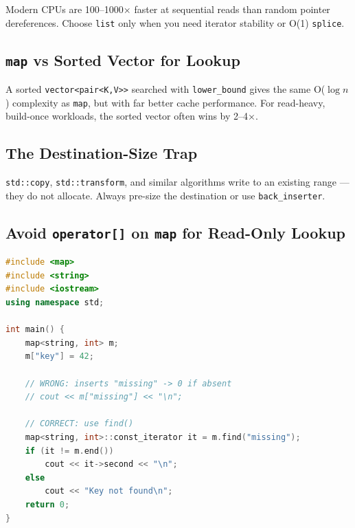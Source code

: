Modern CPUs are 100--1000× faster at sequential reads than random pointer dereferences. Choose \texttt{list} only when you need iterator stability or O(1) \texttt{splice}.

\subsection{\texttt{map} vs Sorted Vector for Lookup}

A sorted \texttt{vector<pair<K,V>>} searched with \texttt{lower\_bound} gives the same O(\(\log n\)) complexity as \texttt{map}, but with far better cache performance. For read-heavy, build-once workloads, the sorted vector often wins by 2--4×.

\subsection{The Destination-Size Trap}

\texttt{std::copy}, \texttt{std::transform}, and similar algorithms write to an existing range --- they do not allocate. Always pre-size the destination or use \texttt{back\_inserter}.

\subsection{Avoid \texttt{operator[]} on \texttt{map} for Read-Only Lookup}

\begin{lstlisting}[language=C++, caption={Safe read-only map lookup}]
#include <map>
#include <string>
#include <iostream>
using namespace std;

int main() {
    map<string, int> m;
    m["key"] = 42;

    // WRONG: inserts "missing" -> 0 if absent
    // cout << m["missing"] << "\n";

    // CORRECT: use find()
    map<string, int>::const_iterator it = m.find("missing");
    if (it != m.end())
        cout << it->second << "\n";
    else
        cout << "Key not found\n";
    return 0;
}
\end{lstlisting}
